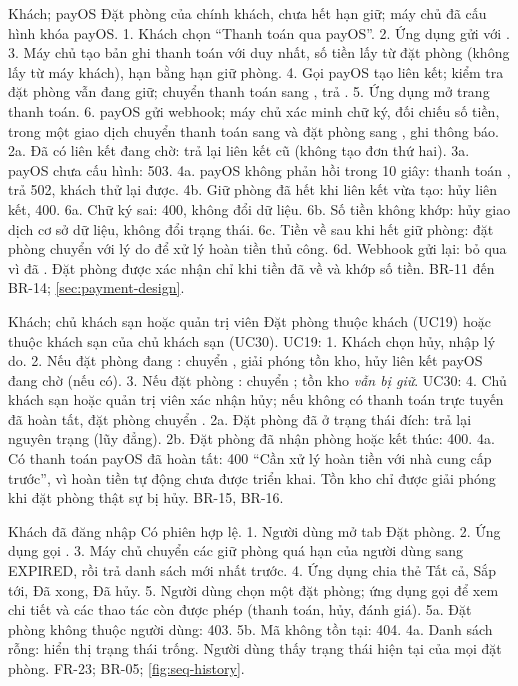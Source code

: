 {Khách; payOS}
{Đặt phòng  của chính khách, chưa hết hạn giữ; máy chủ đã cấu hình khóa payOS.}
{1. Khách chọn ``Thanh toán qua payOS''. 2. Ứng dụng gửi  với . 3. Máy chủ tạo bản ghi thanh toán  với  duy nhất, số tiền lấy từ đặt phòng (không lấy từ máy khách), hạn bằng hạn giữ phòng. 4. Gọi payOS tạo liên kết; kiểm tra đặt phòng vẫn đang giữ; chuyển thanh toán sang , trả . 5. Ứng dụng mở trang thanh toán. 6. payOS gửi webhook; máy chủ xác minh chữ ký, đối chiếu số tiền, trong một giao dịch chuyển thanh toán sang  và đặt phòng sang , ghi thông báo.}
{2a. Đã có liên kết đang chờ: trả lại liên kết cũ (không tạo đơn thứ hai). 3a. payOS chưa cấu hình: 503. 4a. payOS không phản hồi trong 10 giây: thanh toán , trả 502, khách thử lại được. 4b. Giữ phòng đã hết khi liên kết vừa tạo: hủy liên kết, 400. 6a. Chữ ký sai: 400, không đổi dữ liệu. 6b. Số tiền không khớp: hủy giao dịch cơ sở dữ liệu, không đổi trạng thái. 6c. Tiền về sau khi hết giữ phòng: đặt phòng chuyển  với lý do  để xử lý hoàn tiền thủ công. 6d. Webhook gửi lại: bỏ qua vì đã .}
{Đặt phòng được xác nhận chỉ khi tiền đã về và khớp số tiền.}
{BR-11 đến BR-14; \cref{sec:payment-design}.}

{Khách; chủ khách sạn hoặc quản trị viên}
{Đặt phòng thuộc khách (UC19) hoặc thuộc khách sạn của chủ khách sạn (UC30).}
{UC19: 1. Khách chọn hủy, nhập lý do. 2. Nếu đặt phòng đang : chuyển , giải phóng tồn kho, hủy liên kết payOS đang chờ (nếu có). 3. Nếu đặt phòng : chuyển ; tồn kho \emph{vẫn bị giữ}. UC30: 4. Chủ khách sạn hoặc quản trị viên xác nhận hủy; nếu không có thanh toán trực tuyến đã hoàn tất, đặt phòng chuyển .}
{2a. Đặt phòng đã ở trạng thái đích: trả lại nguyên trạng (lũy đẳng). 2b. Đặt phòng đã nhận phòng hoặc kết thúc: 400. 4a. Có thanh toán payOS đã hoàn tất: 400 ``Cần xử lý hoàn tiền với nhà cung cấp trước'', vì hoàn tiền tự động chưa được triển khai.}
{Tồn kho chỉ được giải phóng khi đặt phòng thật sự bị hủy.}
{BR-15, BR-16.}

{Khách đã đăng nhập}
{Có phiên hợp lệ.}
{1. Người dùng mở tab Đặt phòng. 2. Ứng dụng gọi . 3. Máy chủ chuyển các giữ phòng quá hạn của người dùng sang EXPIRED, rồi trả danh sách mới nhất trước. 4. Ứng dụng chia thẻ Tất cả, Sắp tới, Đã xong, Đã hủy. 5. Người dùng chọn một đặt phòng; ứng dụng gọi  để xem chi tiết và các thao tác còn được phép (thanh toán, hủy, đánh giá).}
{5a. Đặt phòng không thuộc người dùng: 403. 5b. Mã không tồn tại: 404. 4a. Danh sách rỗng: hiển thị trạng thái trống.}
{Người dùng thấy trạng thái hiện tại của mọi đặt phòng.}
{FR-23; BR-05; \cref{fig:seq-history}.}

